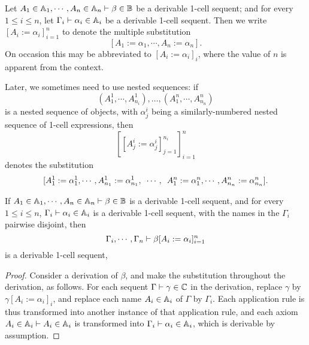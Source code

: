 \documentclass{robinthesisdraft}
\begin{document}
\begin{definition}
	Let $A_{1}\in\mathbb{A}_{1}, \cdots, A_{n}\in\mathbb{A}_{n}\vdash \beta\in\mathbb{B}$
	be a derivable 1-cell sequent; and for every $1\leq i\leq n$, let
	$\Gamma_{i} \vdash \alpha_{i}\in\mathbb{A}_{i}$ be a derivable 1-cell sequent.
	Then we write $[A_{i} := \alpha_{i}]_{i=1}^{n}$ to denote the multiple
	substitution
	\[
		[A_{1} := \alpha_{1}, \cdots, A_{n}:= \alpha_{n}].
	\]
	On occasion this may be abbreviated to $[A_{i} := \alpha_{i}]_{i}$,
	where the value of $n$ is apparent from the context.
	
	Later, we sometimes need to use nested sequences: if
	\[
		(A^{1}_{1}, \cdots, A^{1}_{n_{i}}),
		\dots,
		(A^{n}_{1}, \cdots, A^{n}_{n_{n}})
	\]
	is a nested sequence of objects, with $\alpha^{i}_{j}$ being
	a similarly-numbered nested sequence of 1-cell expressions, then
	\[
		[[A^{i}_{j} := \alpha^{i}_{j}]_{j=1}^{n_{i}}]_{i=1}^{n}
	\]
	denotes the substitution
	\[
		[A^{1}_{1} := \alpha^{1}_{1}, \cdots, A^{1}_{n_{1}}:= \alpha^{1}_{n_{1}},
		\enskip\cdots,\enskip
		A^{n}_{1} := \alpha^{n}_{1}, \cdots, A^{n}_{n_{n}}:= \alpha^{n}_{n_{n}}
		].
	\]
\end{definition}
\begin{lemma}
	If $A_{1}\in\mathbb{A}_{1}, \cdots, A_{n}\in\mathbb{A}_{n}\vdash \beta\in\mathbb{B}$
	is a derivable 1-cell sequent, and for every $1\leq i\leq n$,
	$\Gamma_{i} \vdash \alpha_{i}\in\mathbb{A}_{i}$ is a derivable 1-cell sequent,
	with the names in the $\Gamma_{i}$ pairwise disjoint, then
	\[
		\Gamma_{i},\cdots,\Gamma_{n}\vdash \beta[A_{i} := \alpha_{i}]_{i=1}^{n}
	\]
	is a derivable 1-cell sequent,
\end{lemma}
\begin{proof}
	Consider a derivation of $\beta$, and make the substitution
	throughout the derivation, as follows. For each sequent
	$\Gamma\vdash \gamma\in\mathbb{C}$ in the derivation, replace $\gamma$
	by $\gamma[A_{i} := \alpha_{i}]_{i}$, and replace each name
	$A_{i}\in\mathbb{A}_{i}$ of $\Gamma$ by $\Gamma_{i}$.
	Each application rule is thus transformed
	into another instance of that application rule, and each axiom
	$A_{i}\in\mathbb{A}_{i} \vdash A_{i}\in\mathbb{A}_{i}$
	is transformed into $\Gamma_{i}\vdash \alpha_{i}\in\mathbb{A}_{i}$, which is
	derivable by assumption.
\end{proof}
\end{document}
